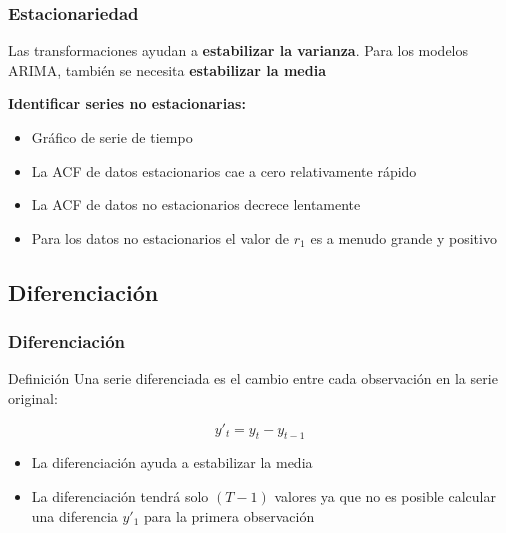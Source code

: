 \documentclass[10pt]{beamer}
\begin{document}



\begin{frame}
\frametitle{Estacionariedad}


Las transformaciones ayudan a \textbf{estabilizar la varianza}. Para los modelos ARIMA, también se necesita \textbf{estabilizar la media}

\vspace{4mm}

\textbf{Identificar series no estacionarias:}

\begin{itemize}
\item Gráfico de serie de tiempo
\item La ACF de datos estacionarios cae a cero relativamente rápido
\item La ACF de datos no estacionarios decrece lentamente
\item Para los datos no estacionarios el valor de $r_1$ es a menudo grande y positivo
\end{itemize}


\end{frame}




\subsection{Diferenciación}


\begin{frame}
\frametitle{Diferenciación}


\begin{block}{Definición}
Una serie diferenciada es el cambio entre cada observación en la serie original:

\begin{equation}
y'_t = y_t - y_{t-1} 
\end{equation}
\end{block}


\begin{itemize}
\item La diferenciación ayuda a estabilizar la media
\item La diferenciación tendrá solo $(T-1)$ valores ya que no es posible calcular una diferencia $y'_1$ para la primera observación 
\end{itemize}



\end{frame}
\end{document}
